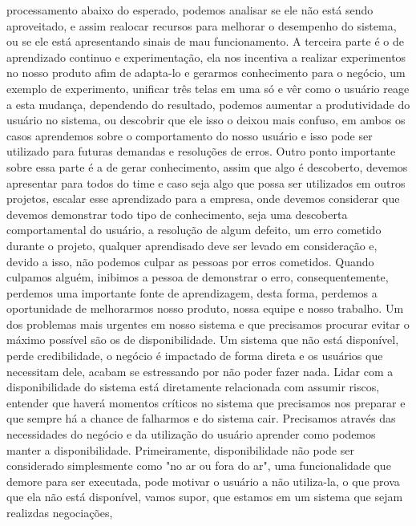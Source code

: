     processamento abaixo do esperado, podemos analisar se ele não está sendo aproveitado,
    e assim realocar recursos para melhorar o desempenho do sistema, ou se ele está
    apresentando sinais de mau funcionamento. A terceira parte é o de aprendizado
    continuo e experimentação, ela nos incentiva a realizar experimentos no nosso
    produto afim de adapta-lo e gerarmos conhecimento para o negócio, um exemplo de
    experimento, unificar três telas em uma só e vêr como o usuário reage a esta
    mudança, dependendo do resultado, podemos aumentar a produtividade do usuário
    no sistema, ou descobrir que ele isso o deixou mais confuso, em ambos os casos
    aprendemos sobre o comportamento do nosso usuário e isso pode ser utilizado para
    futuras demandas e resoluções de erros. Outro ponto importante sobre essa parte
    é a de gerar conhecimento, assim que algo é descoberto, devemos apresentar para
    todos do time e caso seja algo que possa ser utilizados em outros projetos,
    escalar esse aprendizado para a empresa, onde devemos considerar que devemos
    demonstrar todo tipo de conhecimento, seja uma descoberta comportamental do usuário,
    a resolução de algum defeito, um erro cometido durante o projeto, qualquer
    aprendisado deve ser levado em consideração e, devido a isso, não podemos culpar
    as pessoas por erros cometidos. Quando culpamos alguém, inibimos a pessoa de
    demonstrar o erro, consequentemente, perdemos uma importante fonte de aprendizagem,
    desta forma, perdemos a oportunidade de melhorarmos nosso produto, nossa equipe
    e nosso trabalho. \newline
    Um dos problemas mais urgentes em nosso sistema e que precisamos procurar evitar
    o máximo possível são os de disponibilidade. Um sistema que não está disponível,
    perde credibilidade, o negócio é impactado de forma direta e os usuários que
    necessitam dele, acabam se estressando por não poder fazer nada. Lidar com a
    disponibilidade do sistema está diretamente relacionada com assumir riscos,
    entender que haverá momentos críticos no sistema que precisamos nos preparar e
    que sempre há a chance de falharmos e do sistema cair. Precisamos através das
    necessidades do negócio e da utilização do usuário aprender como podemos manter
    a disponibilidade. Primeiramente, disponibilidade não pode ser considerado
    simplesmente como "no ar ou fora do ar", uma funcionalidade que demore para ser
    executada, pode motivar o usuário a não utiliza-la, o que prova que ela não está
    disponível, vamos supor, que estamos em um sistema que sejam realizdas negociações,
